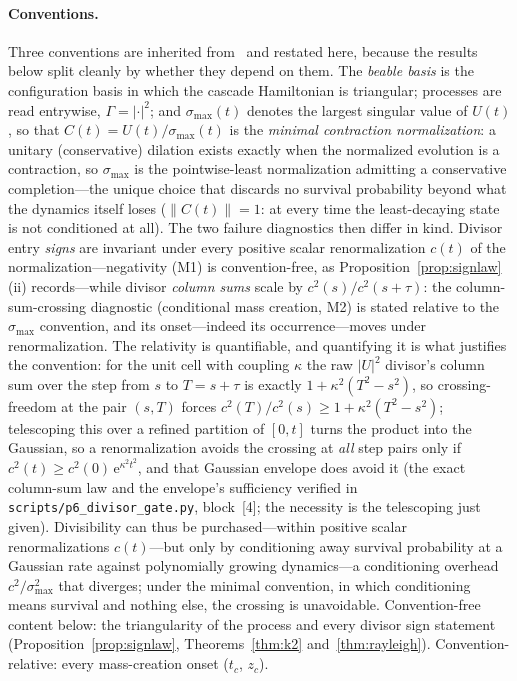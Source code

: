 ﻿\documentclass[11pt]{article}
\newcommand{\ee}{\mathrm{e}}
\newcommand{\norm}[1]{\left\lVert #1 \right\rVert}
\theoremstyle{remark}
\begin{document}
\paragraph{Conventions.} Three conventions are inherited
from~\cite{indivisible,choosing} and restated here, because the
results below split cleanly by whether they depend on them. The
\emph{beable basis} is the configuration basis in which the cascade
Hamiltonian is triangular; processes are read entrywise,
$\Gamma=|{\cdot}|^2$; and $\sigma_{\max}(t)$ denotes the largest
singular value of $U(t)$, so that $C(t)=U(t)/\sigma_{\max}(t)$ is
the \emph{minimal contraction normalization}: a unitary
(conservative) dilation exists exactly when the normalized evolution
is a contraction, so $\sigma_{\max}$ is the pointwise-least
normalization admitting a conservative completion---the unique
choice that discards no survival probability beyond what the
dynamics itself loses ($\norm{C(t)}=1$: at every time the
least-decaying state is not conditioned at all). The two failure
diagnostics then differ in kind. Divisor entry \emph{signs} are
invariant under every positive scalar renormalization $c(t)$ of the
normalization---negativity (M1) is convention-free, as
Proposition~\ref{prop:signlaw}(ii) records---while divisor
\emph{column sums} scale by $c^2(s)/c^2(s+\tau)$: the
column-sum-crossing diagnostic (conditional mass creation, M2) is
stated relative to the $\sigma_{\max}$ convention, and its
onset---indeed its occurrence---moves under renormalization. The
relativity is quantifiable, and quantifying it is what justifies
the convention: for the unit cell with coupling $\kappa$ the raw
$|U|^2$ divisor's column sum over the step from $s$ to $T=s+\tau$
is exactly $1+\kappa^2(T^2-s^2)$, so
crossing-freedom at the pair $(s,T)$ forces
$c^2(T)/c^2(s)\ge1+\kappa^2(T^2-s^2)$; telescoping this over a
refined partition of $[0,t]$ turns the product into the Gaussian, so
a renormalization avoids the crossing at \emph{all} step pairs only
if $c^2(t)\ge c^2(0)\,\ee^{\kappa^2t^2}$, and that Gaussian envelope
does avoid it (the exact column-sum law and the envelope's
sufficiency verified in \texttt{scripts/p6\_divisor\_gate.py},
block~[4]; the necessity is the telescoping just given). Divisibility
can thus be purchased---within positive scalar renormalizations
$c(t)$---but only by
conditioning away survival probability at a Gaussian rate against
polynomially growing dynamics---a conditioning overhead
$c^2/\sigma_{\max}^2$ that diverges; under the minimal convention,
in which conditioning means survival and nothing else, the crossing
is unavoidable. Convention-free content below: the triangularity of
the process and every divisor sign statement
(Proposition~\ref{prop:signlaw}, Theorems~\ref{thm:k2}
and~\ref{thm:rayleigh}). Convention-relative: every mass-creation
onset ($t_c$, $z_c$).
\end{document}
